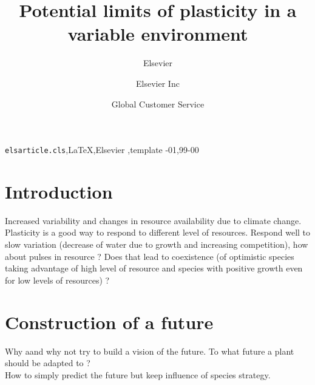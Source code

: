 \documentclass[review]{elsarticle}
\begin{document}
\begin{frontmatter}

\title{Potential limits of plasticity in a variable environment}

\author{Elsevier}
\address{Radarweg 29, Amsterdam}

\author[mymainaddress,mysecondaryaddress]{Elsevier Inc}

\author[mysecondaryaddress]{Global Customer Service}

\address[mymainaddress]{1600 John F Kennedy Boulevard, Philadelphia}
\address[mysecondaryaddress]{360 Park Avenue South, New York}

\begin{abstract}
\end{abstract}

\begin{keyword}
\texttt{elsarticle.cls}\sep \LaTeX\sep Elsevier \sep template
-01\sep  99-00
\end{keyword}

\end{frontmatter}

\linenumbers


\section{Introduction}

Increased variability and changes in resource availability due to climate change.\\
Plasticity is a good way to respond to different level of resources.
Respond well to slow variation (decrease of water due to growth and increasing competition), how about pulses in resource ? Does that lead to coexistence  (of optimistic species taking advantage of high level of resource and species with positive growth even for low levels of resources) ?

\section{Construction of a future}
Why aand why not try to build a vision of the future. To what future a plant should be adapted to ?\\
How to simply predict the future but keep influence of species strategy.
\end{document}
